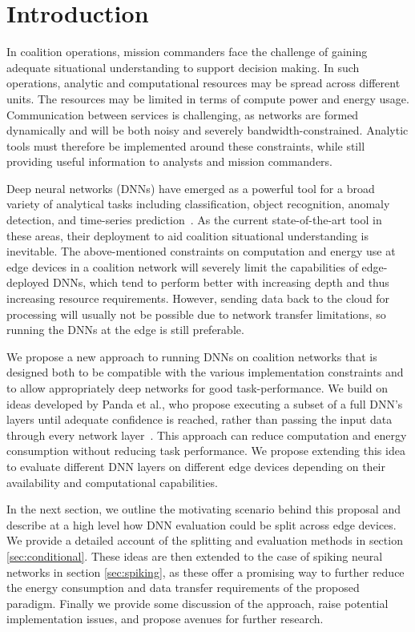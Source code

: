 \section{Introduction}
\label{sec:intro}
In coalition operations, mission commanders face the challenge of gaining adequate situational understanding to support decision making. In such operations, analytic and computational resources may be spread across different units. The resources may be limited in terms of compute power and energy usage. Communication between services is challenging, as networks are formed dynamically and will be both noisy and severely bandwidth-constrained. Analytic tools must therefore be implemented around these constraints, while still providing useful information to analysts and mission commanders.

Deep neural networks (DNNs) have emerged as a powerful tool for a broad variety of analytical tasks including classification, object recognition, anomaly detection, and time-series prediction~\cite{Goodfellow:2016}. As the current state-of-the-art tool in these areas, their deployment to aid coalition situational understanding is inevitable. The above-mentioned constraints on computation and energy use at edge devices in a coalition network will severely limit the capabilities of edge-deployed DNNs, which tend to perform better with increasing depth and thus increasing resource requirements. However, sending data back to the cloud for processing will usually not be possible due to network transfer limitations, so running the DNNs at the edge is still preferable.

We propose a new approach to running DNNs on coalition networks that is designed both to be compatible with the various implementation constraints and to allow appropriately deep networks for good task-performance. We build on ideas developed by Panda et al., who propose executing a subset of a full DNN's layers until adequate confidence is reached, rather than passing the input data through every network layer~\cite{panda2016conditional, panda2017energy}. This approach can reduce computation and energy consumption without reducing task performance. We propose extending this idea to evaluate different DNN layers on different edge devices depending on their availability and computational capabilities.

In the next section, we outline the motivating scenario behind this proposal and describe at a high level how DNN evaluation could be split across edge devices. We provide a detailed account of the splitting and evaluation methods in section \ref{sec:conditional}. These ideas are then extended to the case of spiking neural networks in section \ref{sec:spiking}, as these offer a promising way to further reduce the energy consumption and data transfer requirements of the proposed paradigm. Finally we provide some discussion of the approach, raise potential implementation issues, and propose avenues for further research.